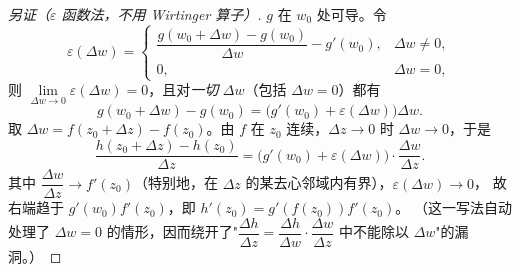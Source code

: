 \begin{proof}[另证（$\varepsilon$ 函数法，不用 Wirtinger 算子）]
$g$ 在 $w_0$ 处可导。令
\[
\varepsilon(\Delta w)=
\begin{cases}
\dfrac{g(w_0+\Delta w)-g(w_0)}{\Delta w}-g'(w_0), & \Delta w\neq 0,\\[3mm]
0, & \Delta w=0,
\end{cases}
\]
则 $\lim\limits_{\Delta w\to 0}\varepsilon(\Delta w)=0$，且对\emph{一切} $\Delta w$（包括 $\Delta w=0$）都有
\[
g(w_0+\Delta w)-g(w_0)=\bigl(g'(w_0)+\varepsilon(\Delta w)\bigr)\Delta w .
\]
取 $\Delta w=f(z_0+\Delta z)-f(z_0)$。由 $f$ 在 $z_0$ 连续，$\Delta z\to0$ 时 $\Delta w\to0$，于是
\[
\frac{h(z_0+\Delta z)-h(z_0)}{\Delta z}
=\bigl(g'(w_0)+\varepsilon(\Delta w)\bigr)\cdot\frac{\Delta w}{\Delta z}.
\]
其中 $\dfrac{\Delta w}{\Delta z}\to f'(z_0)$（特别地，在 $\Delta z$ 的某去心邻域内有界），$\varepsilon(\Delta w)\to0$，
故右端趋于 $g'(w_0)f'(z_0)$，即 $h'(z_0)=g'(f(z_0))f'(z_0)$。
（这一写法自动处理了 $\Delta w=0$ 的情形，因而绕开了"$\dfrac{\Delta h}{\Delta z}=\dfrac{\Delta h}{\Delta w}\cdot\dfrac{\Delta w}{\Delta z}$ 中不能除以 $\Delta w$"的漏洞。）
\end{proof}

